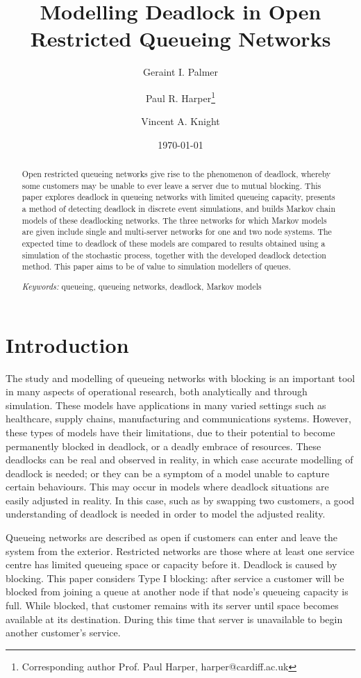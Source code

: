 \documentclass{article}
\title{Modelling Deadlock in Open Restricted Queueing Networks}
\author{Geraint I. Palmer}
\author{Paul R. Harper\thanks{Corresponding author Prof. Paul Harper, harper@cardiff.ac.uk}}
\author{Vincent A. Knight}
\affil{\small{\textit{School of Mathematics, Cardiff University, Senghennydd Road, Cardiff, CF24 4AG}}}
\date{\today}
\numberwithin{equation}{section}
\begin{document}
\onehalfspacing

\maketitle

\begin{abstract}
Open restricted queueing networks give rise to the phenomenon of deadlock,
whereby some customers may be unable to ever leave a server due to mutual
blocking.
This paper explores deadlock in queueing networks with limited queueing
capacity, presents a method of detecting deadlock in discrete event
simulations, and builds Markov chain models of these deadlocking networks.
The three networks for which Markov models are given include single and
multi-server networks for one and two node systems.
The expected time to deadlock of these models are compared to results obtained
using a simulation of the stochastic process, together with the developed
deadlock detection method.
This paper aims to be of value to simulation modellers of queues.

\textit{Keywords:} queueing, queueing networks, deadlock, Markov models
\end{abstract}

\section{Introduction}

The study and modelling of queueing networks with blocking is an important
tool in many aspects of operational research, both analytically and through
simulation.
These models have applications in many varied settings such as healthcare,
supply chains, manufacturing and communications systems.
However, these types of models have their limitations, due to their potential
to become permanently blocked in deadlock, or a deadly embrace of resources.
These deadlocks can be real and observed in reality, in which case accurate
modelling of deadlock is needed; or they can be a symptom of a model unable to
capture certain behaviours.
This may occur in models where deadlock situations are easily adjusted in
reality.
In this case, such as by swapping two customers, a good understanding of
deadlock is needed in order to model the adjusted reality.

Queueing networks are described as open if customers can enter and leave the
system from the exterior.
Restricted networks are those where at least one service centre has limited
queueing space or capacity before it.
Deadlock is caused by blocking.
This paper considers Type I blocking: after service a customer will be blocked
from joining a queue at another node if that node's queueing capacity is full.
While blocked, that customer remains with its server until space becomes
available at its destination.
During this time that server is unavailable to begin another customer's
service.
\end{document}
